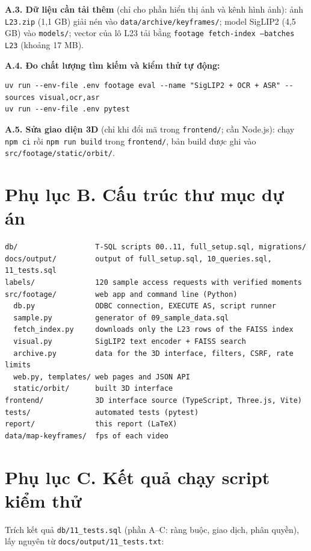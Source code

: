 \textbf{A.3. Dữ liệu cần tải thêm} (chỉ cho phần hiển thị ảnh và kênh hình ảnh): ảnh
\texttt{L23.zip} (1,1 GB) giải nén vào \texttt{data/archive/keyframes/}; model SigLIP2 (4,5 GB)
vào \texttt{models/}; vector của lô L23 tải bằng \texttt{footage fetch-index --batches L23}
(khoảng 17 MB).

\textbf{A.4. Đo chất lượng tìm kiếm và kiểm thử tự động:}
\begin{lstlisting}[style=terminal, language={}]
uv run --env-file .env footage eval --name "SigLIP2 + OCR + ASR" --sources visual,ocr,asr
uv run --env-file .env pytest
\end{lstlisting}

\textbf{A.5. Sửa giao diện 3D} (chỉ khi đổi mã trong \texttt{frontend/}; cần Node.js): chạy
\texttt{npm ci} rồi \texttt{npm run build} trong \texttt{frontend/}, bản build được ghi vào
\texttt{src/footage/static/orbit/}.

\section*{Phụ lục B. Cấu trúc thư mục dự án}

\begin{lstlisting}[style=terminal, language={}]
db/                  T-SQL scripts 00..11, full_setup.sql, migrations/
docs/output/         output of full_setup.sql, 10_queries.sql, 11_tests.sql
labels/              120 sample access requests with verified moments
src/footage/         web app and command line (Python)
  db.py              ODBC connection, EXECUTE AS, script runner
  sample.py          generator of 09_sample_data.sql
  fetch_index.py     downloads only the L23 rows of the FAISS index
  visual.py          SigLIP2 text encoder + FAISS search
  archive.py         data for the 3D interface, filters, CSRF, rate limits
  web.py, templates/ web pages and JSON API
  static/orbit/      built 3D interface
frontend/            3D interface source (TypeScript, Three.js, Vite)
tests/               automated tests (pytest)
report/              this report (LaTeX)
data/map-keyframes/  fps of each video
\end{lstlisting}

\section*{Phụ lục C. Kết quả chạy script kiểm thử}

Trích kết quả \texttt{db/11\_tests.sql} (phần A--C: ràng buộc, giao dịch, phân quyền), lấy nguyên từ
\texttt{docs/output/11\_tests.txt}:

{\footnotesize
{}
}
